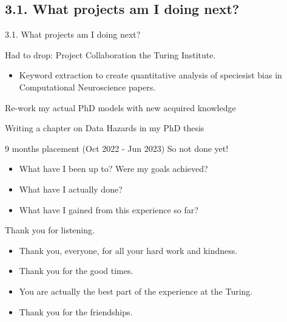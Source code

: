 \documentclass[t]{beamer}
\begin{document}
\subsection{3.1. What projects am I doing next?}
\begin{frame}{3.1. What projects am I doing next?}
  	\begin{block}{Had to drop: Project Collaboration the Turing Institute.}
    	\begin{itemize}    
    		\item Keyword extraction to create quantitative analysis of speciesist bias in Computational Neuroscience papers. 
    				\end{itemize}  
	\end{block}
 
  	\begin{block}{Re-work my actual PhD models with new acquired knowledge}
	\end{block}
        \begin{block}{Writing a chapter on Data Hazards in my PhD thesis}
	\end{block}
\end{frame}




\begin{frame}{9 months placement (Oct 2022 - Jun 2023) So not done yet!}
    \begin{itemize}
        \item What have I been up to? Were my goals achieved? 
        \item What have I actually done?
        \item What have I gained from this experience so far?
    \end{itemize}
\end{frame}

\begin{frame}{Thank you for listening.}	
    \begin{itemize}
        \item Thank you, everyone, for all your hard work and kindness. 
        \item Thank you for the good times. 
        \item You are actually the best part of the experience at the Turing.
        \item Thank you for the friendships.
    \end{itemize}
\end{frame}
\end{document}
